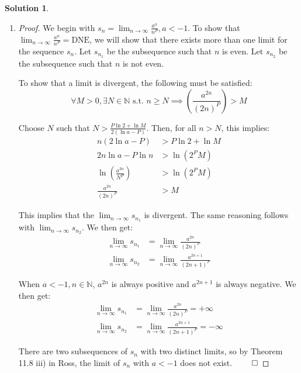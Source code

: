 \documentclass[12pt]{article}
\theoremstyle{definition} %
\newtheorem{solution}{Solution}
\theoremstyle{plain} %
\begin{document}
\begin{solution}
\begin{enumerate}
\begin{proof}
        The \(\lim_{n \to \infty} \left| \frac{s_{n+1}}{s_n} \right|\) exists, so Problem 1 applies. According to the result from Problem 1a, if \(\lim_{n \to \infty} \left| \frac{s_{n+1}}{s_n} \right| > 1\), then \(\lim_{n \to \infty} s_n = +\infty\). When \(a > 1\), \(\lim_{n \to \infty} \frac{a^n}{n^P} = a\). Therefore, its limit must be \(+\infty\) when \(a > 1\), as desired. \(\qed\)
    \end{proof}
    \item \begin{proof}
        We begin with \(s_n = \lim_{n \to \infty} \frac{a^n}{n^P}, a < -1\). To show that \(\lim_{n \to \infty} \frac{a^n}{n^P} = \text{DNE}\), we will show that there exists more than one limit for the sequence \(s_n\). Let \(s_{n_1}\) be the subsequence such that \(n\) is even. Let \(s_{n_2}\) be the subsequence such that \(n\) is not even. 
    
        To show that a limit is divergent, the following must be satisfied: 
        \[
        \forall M > 0, \exists N \in \mathbb{N} \text{ s.t. } n \geq N \implies \left( \frac{a^{2n}}{(2n)^P} \right) > M \tag{23}
        \]
    
        Choose \(N\) such that \(N > \frac{P \ln 2 + \ln M}{2 (\ln a - P)}\). Then, for all \(n > N\), this implies:
        \begin{align}
            n(2 \ln a - P) &> P \ln 2 + \ln M \tag{24} \\
            2n \ln a - P \ln n &> \ln (2^P M) \tag{25} \\
            \ln \left( \frac{a^{2n}}{N^P} \right) &> \ln (2^P M) \tag{26} \\
            \frac{a^{2n}}{(2n)^P} &> M \tag{27}
        \end{align}
    
        This implies that the \(\lim_{n \to \infty} s_{n_1}\) is divergent. The same reasoning follows with \(\lim_{n \to \infty} s_{n_2}\). We then get:
        \begin{align}
            \lim_{n \to \infty} s_{n_1} &= \lim_{n \to \infty} \frac{a^{2n}}{(2n)^P} \tag{28} \\
            \lim_{n \to \infty} s_{n_2} &= \lim_{n \to \infty} \frac{a^{2n+1}}{(2n+1)^P} \tag{29}
        \end{align}
    
        When \(a < -1, n \in \mathbb{N}\), \(a^{2n}\) is always positive and \(a^{2n+1}\) is always negative. We then get:
        \begin{align}
            \lim_{n \to \infty} s_{n_1} &= \lim_{n \to \infty} \frac{a^{2n}}{(2n)^P} = +\infty \tag{31} \\
            \lim_{n \to \infty} s_{n_2} &= \lim_{n \to \infty} \frac{a^{2n+1}}{(2n+1)^P} = -\infty \tag{32}
        \end{align}
    
        There are two subsequences of \(s_n\) with two distinct limits, so by Theorem 11.8 iii) in Ross, the limit of \(s_n\) with \(a < -1\) does not exist. \(\qed\)
    \end{proof}
\end{enumerate}
\end{solution}
\end{document}
